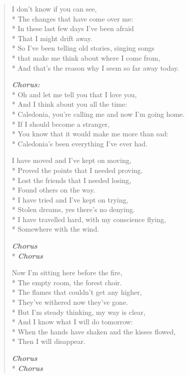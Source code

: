 \documentclass[9pt,twoside]{extarticle}
\makeatletter
\newenvironment{xverse}{
	\begin{verse}
	\fontsize{8.5}{10.5}\selectfont
}{
	\end{verse}
}
\newcommand{\chorusdef}{\textbf{\emph{Chorus:}}\\*}
\newcommand{\chorus@mark}[1][1]{%
\textbf{\emph{Chorus \ifthenelse{\equal{#1}{1}}{}{$\times$ #1}}}%
}
\newcommand{\chorusmark}[1][1]{%
\ifvmode%
\vspace{-0.5\stanzaskip}%
\chorus@mark[#1]%
\vspace{-0.5\stanzaskip}%
\else \\*%
\chorus@mark[#1]%
\fi%
}
\makeatother
\begin{document}
\begin{xverse}
I don’t know if you can see, \\*
The changes that have come over me: \\*
In these last few days I’ve been afraid \\*
That I might drift away. \\*
So I’ve been telling old stories, singing songs \\*
that make me think about where I come from, \\*
And that’s the reason why I seem so far away today.

\chorusdef
Oh and let me tell you that I love you, \\*
And I think about you all the time: \\*
Caledonia, you’re calling me and now I’m going home. \\*
If I should become a stranger, \\*
You know that it would make me more than sad: \\*
Caledonia’s been everything I’ve ever had.

I have moved and I’ve kept on moving, \\*
Proved the points that I needed proving. \\*
Lost the friends that I needed losing, \\*
Found others on the way. \\*
I have tried and I’ve kept on trying, \\*
Stolen dreams, yes there’s no denying. \\*
I have travelled hard, with my conscience flying, \\*
Somewhere with the wind.

\chorusmark

Now I’m sitting here before the fire, \\*
The empty room, the forest choir. \\*
The flames that couldn’t get any higher, \\*
They’ve withered now they’ve gone. \\*
But I’m steady thinking, my way is clear, \\*
And I know what I will do tomorrow: \\*
When the hands have shaken and the kisses flowed, \\*
Then I will disappear.

\chorusmark
\end{xverse}
\end{document}
